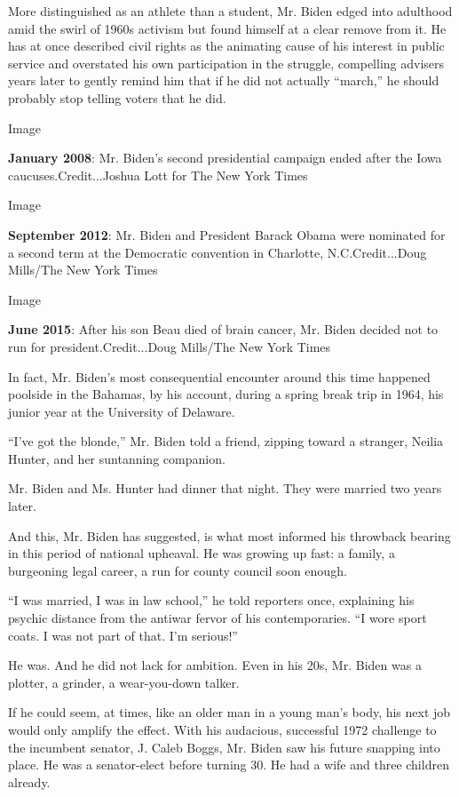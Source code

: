 More distinguished as an athlete than a student, Mr. Biden edged into
adulthood amid the swirl of 1960s activism but found himself at a clear
remove from it. He has at once described civil rights as the animating
cause of his interest in public service and overstated his own
participation in the struggle, compelling advisers years later to gently
remind him that if he did not actually ``march,'' he should probably
stop telling voters that he did.

Image

\textbf{January 2008}: Mr. Biden's second presidential campaign ended
after the Iowa caucuses.Credit...Joshua Lott for The New York Times

Image

\textbf{September 2012}: Mr. Biden and President Barack Obama were
nominated for a second term at the Democratic convention in Charlotte,
N.C.Credit...Doug Mills/The New York Times

Image

\textbf{June 2015}: After his son Beau died of brain cancer, Mr. Biden
decided not to run for president.Credit...Doug Mills/The New York Times

In fact, Mr. Biden's most consequential encounter around this time
happened poolside in the Bahamas, by his account, during a spring break
trip in 1964, his junior year at the University of Delaware.

``I've got the blonde,'' Mr. Biden told a friend, zipping toward a
stranger, Neilia Hunter, and her suntanning companion.

Mr. Biden and Ms. Hunter had dinner that night. They were married two
years later.

And this, Mr. Biden has suggested, is what most informed his throwback
bearing in this period of national upheaval. He was growing up fast: a
family, a burgeoning legal career, a run for county council soon enough.

``I was married, I was in law school,'' he told reporters once,
explaining his psychic distance from the antiwar fervor of his
contemporaries. ``I wore sport coats. I was not part of that. I'm
serious!''

He was. And he did not lack for ambition. Even in his 20s, Mr. Biden was
a plotter, a grinder, a wear-you-down talker.

If he could seem, at times, like an older man in a young man's body, his
next job would only amplify the effect. With his audacious, successful
1972 challenge to the incumbent senator, J. Caleb Boggs, Mr. Biden saw
his future snapping into place. He was a senator-elect before turning
30. He had a wife and three children already.

